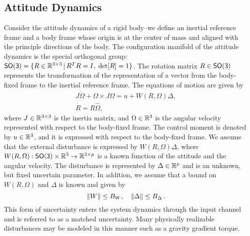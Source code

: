 \documentclass[letterpaper, 10 pt, conference]{ieeeconf}  %
\begin{document}
\subsection{Attitude Dynamics}\label{sec:att_dyn}
Consider the attitude dynamics of a rigid body--we define an inertial reference frame and a body frame whose origin is at the center of mass and aligned with the principle directions of the body. 
The configuration manifold of the attitude dynamics is the special orthogonal group: \(\mathsf{SO(3)} = \{R\in\mathbb{R}^{3\times 3}\,|\, R^TR=I,\;\mathrm{det}[R]=1\} \).
The rotation matrix $R\in\mathsf{SO(3)}$ represents the transformation of the representation of a vector from the body-fixed frame to the inertial reference frame. 
The equations of motion are given by
\begin{gather}
	J\dot\Omega + \Omega\times J\Omega = u+W(R,\Omega)\Delta ,\label{eqn:Wdot}\\
	\dot R = R\hat\Omega ,\label{eqn:Rdot}
\end{gather}
where $J\in\mathbb{R}^{3\times 3}$ is the inertia matrix, and $\Omega\in\mathbb{R}^{3}$ is the angular velocity represented with respect to the body-fixed frame. 
The control moment is denoted by $u\in\mathbb{R}^{3}$, and it is expressed with respect to the body-fixed frame. 
We assume that the external disturbance is expressed by $W(R,\Omega)\Delta$, where $W(R,\Omega):\mathsf{SO(3)}\times\mathbb{R}^{3}\rightarrow \mathbb{R}^{3\times p}$ is a known function of the attitude and the angular velocity.
The disturbance is represented by $\Delta\in\mathbb{R}^{p}$ and is an unknown, but fixed uncertain parameter.
In addition, we assume that a bound on \( W(R, \Omega) \text{ and } \Delta \) is known and given by
\begin{equation}
	\left\| W \right\| \leq B_W , \quad \left\| \Delta \right\| \leq B_\Delta \,. \label{eqn:W_bound}
\end{equation}
This form of uncertainty enters the system dynamics through the input channel and is referred to as a matched uncertainty. 
Many physically realizable disturbances may be modeled in this manner such as a gravity gradient torque.
\end{document}
